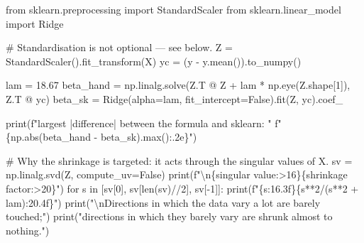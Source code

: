 \documentclass[
  letterpaper,
  10pt,
  twoside,
  openright,
  numbers=noenddot,
  chapterprefix=true]{scrbook}
\newenvironment{Shaded}{}{}
\newcommand{\BuiltInTok}[1]{\textcolor[rgb]{0.84,0.23,0.29}{#1}}
\newcommand{\CharTok}[1]{\textcolor[rgb]{0.01,0.18,0.38}{#1}}
\newcommand{\CommentTok}[1]{\textcolor[rgb]{0.42,0.45,0.49}{#1}}
\newcommand{\ControlFlowTok}[1]{\textcolor[rgb]{0.84,0.23,0.29}{#1}}
\newcommand{\DecValTok}[1]{\textcolor[rgb]{0.00,0.36,0.77}{#1}}
\newcommand{\FloatTok}[1]{\textcolor[rgb]{0.00,0.36,0.77}{#1}}
\newcommand{\ImportTok}[1]{\textcolor[rgb]{0.01,0.18,0.38}{#1}}
\newcommand{\KeywordTok}[1]{\textcolor[rgb]{0.84,0.23,0.29}{#1}}
\newcommand{\NormalTok}[1]{\textcolor[rgb]{0.14,0.16,0.18}{#1}}
\newcommand{\OperatorTok}[1]{\textcolor[rgb]{0.14,0.16,0.18}{#1}}
\newcommand{\SpecialCharTok}[1]{\textcolor[rgb]{0.00,0.36,0.77}{#1}}
\newcommand{\SpecialStringTok}[1]{\textcolor[rgb]{0.01,0.18,0.38}{#1}}
\newcommand{\StringTok}[1]{\textcolor[rgb]{0.01,0.18,0.38}{#1}}
\newcommand{\VariableTok}[1]{\textcolor[rgb]{0.89,0.38,0.04}{#1}}
\begin{document}
\label{check-ridge}
\begin{Shaded}
\begin{Highlighting}[]
\ImportTok{from}\NormalTok{ sklearn.preprocessing }\ImportTok{import}\NormalTok{ StandardScaler}
\ImportTok{from}\NormalTok{ sklearn.linear\_model }\ImportTok{import}\NormalTok{ Ridge}

\CommentTok{\# Standardisation is not optional — see below.}
\NormalTok{Z }\OperatorTok{=}\NormalTok{ StandardScaler().fit\_transform(X)}
\NormalTok{yc }\OperatorTok{=}\NormalTok{ (y }\OperatorTok{{-}}\NormalTok{ y.mean()).to\_numpy()}

\NormalTok{lam }\OperatorTok{=} \FloatTok{18.67}
\NormalTok{beta\_hand }\OperatorTok{=}\NormalTok{ np.linalg.solve(Z.T }\OperatorTok{@}\NormalTok{ Z }\OperatorTok{+}\NormalTok{ lam }\OperatorTok{*}\NormalTok{ np.eye(Z.shape[}\DecValTok{1}\NormalTok{]), Z.T }\OperatorTok{@}\NormalTok{ yc)}
\NormalTok{beta\_sk }\OperatorTok{=}\NormalTok{ Ridge(alpha}\OperatorTok{=}\NormalTok{lam, fit\_intercept}\OperatorTok{=}\VariableTok{False}\NormalTok{).fit(Z, yc).coef\_}

\BuiltInTok{print}\NormalTok{(}\SpecialStringTok{f"largest |difference| between the formula and sklearn: "}
      \SpecialStringTok{f"}\SpecialCharTok{\{}\NormalTok{np}\SpecialCharTok{.}\BuiltInTok{abs}\NormalTok{(beta\_hand }\OperatorTok{{-}}\NormalTok{ beta\_sk)}\SpecialCharTok{.}\BuiltInTok{max}\NormalTok{()}\SpecialCharTok{:.2e\}}\SpecialStringTok{"}\NormalTok{)}

\CommentTok{\# Why the shrinkage is targeted: it acts through the singular values of X.}
\NormalTok{sv }\OperatorTok{=}\NormalTok{ np.linalg.svd(Z, compute\_uv}\OperatorTok{=}\VariableTok{False}\NormalTok{)}
\BuiltInTok{print}\NormalTok{(}\SpecialStringTok{f"}\CharTok{\textbackslash{}n}\SpecialCharTok{\{}\StringTok{\textquotesingle{}singular value\textquotesingle{}}\SpecialCharTok{:\textgreater{}16\}\{}\StringTok{\textquotesingle{}shrinkage factor\textquotesingle{}}\SpecialCharTok{:\textgreater{}20\}}\SpecialStringTok{"}\NormalTok{)}
\ControlFlowTok{for}\NormalTok{ s }\KeywordTok{in}\NormalTok{ [sv[}\DecValTok{0}\NormalTok{], sv[}\BuiltInTok{len}\NormalTok{(sv)}\OperatorTok{//}\DecValTok{2}\NormalTok{], sv[}\OperatorTok{{-}}\DecValTok{1}\NormalTok{]]:}
    \BuiltInTok{print}\NormalTok{(}\SpecialStringTok{f"}\SpecialCharTok{\{}\NormalTok{s}\SpecialCharTok{:16.3f\}\{}\NormalTok{s}\OperatorTok{**}\DecValTok{2}\OperatorTok{/}\NormalTok{(s}\OperatorTok{**}\DecValTok{2} \OperatorTok{+}\NormalTok{ lam)}\SpecialCharTok{:20.4f\}}\SpecialStringTok{"}\NormalTok{)}
\BuiltInTok{print}\NormalTok{(}\StringTok{"}\CharTok{\textbackslash{}n}\StringTok{Directions in which the data vary a lot are barely touched;"}\NormalTok{)}
\BuiltInTok{print}\NormalTok{(}\StringTok{"directions in which they barely vary are shrunk almost to nothing."}\NormalTok{)}
\end{Highlighting}
\end{Shaded}
\end{document}
